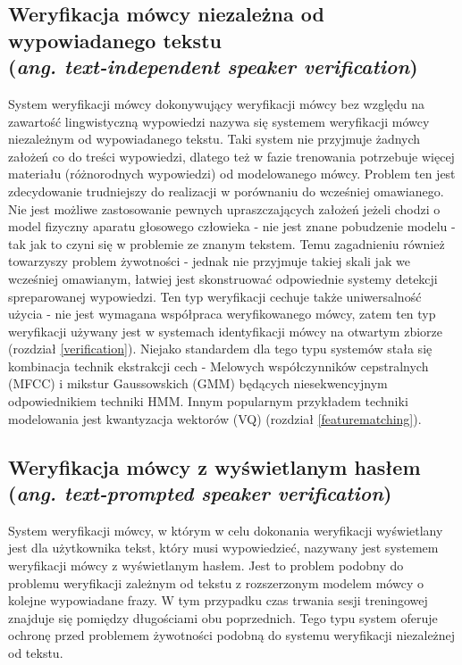\subsection{Weryfikacja mówcy niezależna od wypowiadanego tekstu \\ (\textit{ang. text-independent speaker verification})}
System weryfikacji mówcy dokonywujący weryfikacji mówcy bez względu na zawartość lingwistyczną wypowiedzi nazywa się systemem weryfikacji mówcy niezależnym od wypowiadanego tekstu. Taki system nie przyjmuje żadnych założeń co do treści wypowiedzi, dlatego też w fazie trenowania potrzebuje więcej materiału (różnorodnych wypowiedzi) od modelowanego mówcy. Problem ten jest zdecydowanie trudniejszy do realizacji w porównaniu do wcześniej omawianego. Nie jest możliwe zastosowanie pewnych upraszczających założeń jeżeli chodzi o model fizyczny aparatu głosowego człowieka - nie jest znane pobudzenie modelu - tak jak to czyni się w problemie ze znanym tekstem. Temu zagadnieniu również towarzyszy problem żywotności - jednak nie przyjmuje takiej skali jak we wcześniej omawianym, łatwiej jest skonstruować odpowiednie systemy detekcji spreparowanej wypowiedzi. Ten typ weryfikacji cechuje także uniwersalność użycia - nie jest wymagana współpraca weryfikowanego mówcy, zatem ten typ weryfikacji używany jest w systemach identyfikacji mówcy na otwartym zbiorze (rozdział \ref{verification}). Niejako standardem dla tego typu systemów stała się kombinacja technik ekstrakcji cech - Melowych współczynników cepstralnych (MFCC) i mikstur Gaussowskich (GMM) będących niesekwencyjnym odpowiednikiem techniki HMM. Innym popularnym przykładem techniki modelowania jest kwantyzacja wektorów (VQ) (rozdział \ref{featurematching}). 

\subsection{Weryfikacja mówcy z wyświetlanym hasłem \\ (\textit{ang. text-prompted speaker verification})}
\label{prompted}
System weryfikacji mówcy, w którym w celu dokonania weryfikacji wyświetlany jest dla użytkownika tekst, który musi wypowiedzieć, nazywany jest systemem weryfikacji mówcy z wyświetlanym hasłem. Jest to problem podobny do problemu weryfikacji zależnym od tekstu z rozszerzonym modelem mówcy o kolejne wypowiadane frazy. W tym przypadku czas trwania sesji treningowej znajduje się pomiędzy długościami obu poprzednich. Tego typu system oferuje ochronę przed problemem żywotności podobną do systemu weryfikacji niezależnej od tekstu. 

